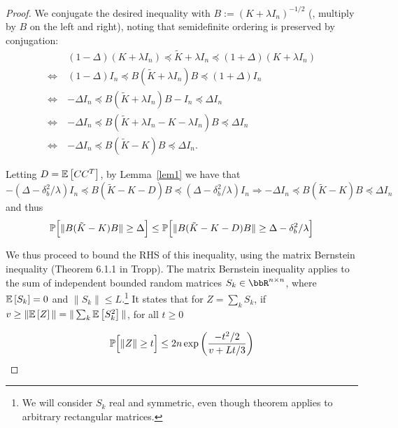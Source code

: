\documentclass[12pt]{article}
\newcommand{\tK}{\tilde{K}}
\newcommand{\defeq}{:=}
\begin{document}
\begin{proof}
	We conjugate the desired inequality with $B \defeq (K + \lambda I_n)^{-1/2}$ (\ie, 
	multiply by $B$ on the left and right), noting that semidefinite ordering is
	preserved by conjugation:
	\begin{align*}
	&(1 - \Delta) (K + \lambda I_n) \preceq \tK + \lambda I_n \preceq (1 + \Delta) (K + \lambda I_n) \\
	\iff\ &(1 - \Delta) I_n \preceq B (\tK + \lambda I_n) B \preceq (1 + \Delta) I_n \\
	\iff\ &-\Delta I_n \preceq B (\tK + \lambda I_n) B - I_n \preceq \Delta I_n \\
	\iff\ &-\Delta I_n \preceq B (\tK + \lambda I_n - K - \lambda I_n) B \preceq \Delta I_n \\
	\iff\ &-\Delta I_n \preceq B (\tK - K) B \preceq \Delta I_n.
	\end{align*}
	
	Letting $D=\expect{}{CC^T}$, by Lemma~\ref{lem1} we have that 
	$$-(\Delta - \delta^2_b/\lambda) I_n \preceq B (\tK - K - D) B \preceq
	(\Delta - \delta^2_b/\lambda) I_n 
	\Longrightarrow -\Delta I_n \preceq B (\tK - K) B \preceq
	\Delta I_n$$
	and thus
	$$\Prob\Big[ \|B (\tK - K) B\| \geq \Delta\Big] \leq  \Prob\Big[ \|B (\tK - K -D) B\| \geq \Delta-\delta_b^2/\lambda\Big]  $$
	
We thus proceed to bound the RHS of this inequality, using the matrix Bernstein inequality (Theorem 6.1.1 in Tropp).  The matrix Bernstein inequality applies to the sum of independent bounded random matrices $S_k \in \RR^{n \times n}$, where $\expect{}{S_k} = 0$ and $\|S_k\| \leq L$.\footnote{We will consider $S_k$ real and symmetric, even though theorem applies to arbitrary rectangular matrices.}  It states that for $Z = \sum_k S_k$, if $v \geq \|\expect{}{Z}\| = \|\sum_k \expect{}{S_k^2}\|$, for all $t \geq 0$
 
	$$\Prob\Big[ \|Z\| \geq t \Big] \leq 2n \exp \left(\frac{-t^2/2}{v + Lt/3} \right)$$


\end{proof}
\end{document}
